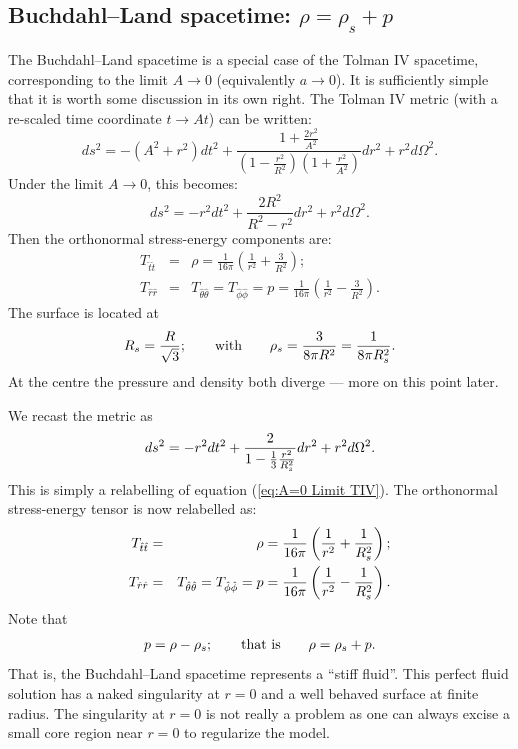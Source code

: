 \documentclass[12pt]{article}
\begin{document}
\subsection{Buchdahl--Land spacetime: $\rho = \rho_s + p$}
The Buchdahl--Land spacetime is a special case of the Tolman IV spacetime, corresponding to the limit  $A\rightarrow0$ (equivalently $a\rightarrow0$).  It is sufficiently simple that it is worth some discussion in its own right. The Tolman IV metric (with a re-scaled time coordinate $t\rightarrow At$) can be written:
%
\begin{equation}
    ds^2 = -(A^2 + r^2)dt^2 + \frac{1 + \frac{2r^2}{A^2}}{\left(1 - \frac{r^2}{R^2}\right)\left(1 + \frac{r^2}{A^2}\right)}dr^2 + r^2d\Omega^2.
\end{equation}
%
Under the limit $A\rightarrow0$, this becomes:
%
\begin{equation}
    ds^2 = -r^2dt^2 + \frac{2R^2}{R^2-r^2}dr^2 + r^2d\Omega^2.
    \label{eq:A=0 Limit TIV}
\end{equation}
%
Then the orthonormal stress-energy components are:
%
\begin{eqnarray}
T_{\hat{t}\hat{t}} &=& \rho = \frac{1}{16\pi}\left(\frac{1}{r^2}+\frac{3}{R^2}\right); \nonumber\\
T_{\hat{r}\hat{r}} &=& T_{\hat{\theta}\hat{\theta}} = T_{\hat{\phi}\hat{\phi}} = p = \frac{1}{16\pi}\left(\frac{1}{r^2}-\frac{3}{R^2}\right).
\end{eqnarray}
%
The surface is located at
%
\begin{equation}
    R_s = \frac{R}{\sqrt{3}};   \qquad \hbox{with} \qquad \rho_s = {3\over8\pi R^2} = {1\over8\pi R_s^2}.
\end{equation}
At the centre the pressure and density both diverge --- more on this point later.

We recast the metric as
\begin{equation}
    ds^2 = -r^2dt^2 + {2 \over1-{1\over3}{r^2\over R_s^2}} dr^2 + r^2d\Omega^2.
    \label{eq:BuchLand}
\end{equation}
%
This is simply a relabelling of equation (\ref{eq:A=0 Limit TIV}).
The orthonormal stress-energy tensor is now relabelled as:
%
\begin{eqnarray}
T_{\hat{t}\hat{t}} &=& \rho = \frac{1}{16\pi}\left(\frac{1}{r^2} +{1\over R_s^2} \right);\nonumber\\
T_{\hat{r}\hat{r}} &=&  T_{\hat{\theta}\hat{\theta}} = T_{\hat{\phi}\hat{\phi}} = p = \frac{1}{16\pi}\left(\frac{1}{r^2} -{1\over R_s^2}\right).
\end{eqnarray}
Note that
\begin{equation}
p = \rho-\rho_s; \qquad \hbox{that is} \qquad \rho=\rho_s + p.
\end{equation}
That is, the Buchdahl--Land spacetime represents a ``stiff fluid''. 
This perfect fluid solution has a naked singularity at $r=0$ and a well behaved surface at finite radius.
The singularity at $r=0$ is not really a problem as one can always excise a small core region near $r=0$ to regularize the model.
\end{document}
